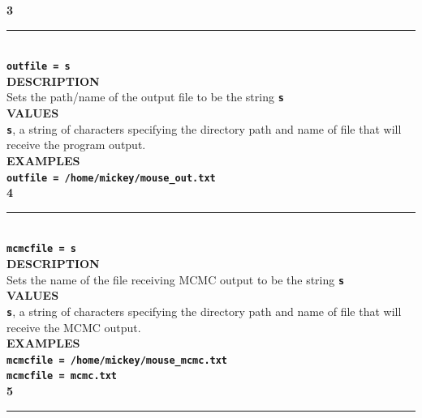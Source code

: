 \documentclass[a4paper]{book}
\numberwithin{equation}{section} \renewcommand{\baselinestretch}{0.55}
\begin{document}
\noindent\textbf{{\large 3}} \\
\noindent\rule{\textwidth}{0.8pt} \\
\textbf{{\Large \texttt{outfile = s}}} \vspace{5pt}\\
\textbf{DESCRIPTION} \vspace{5pt}\\
Sets the path/name of the output file to be the string \textbf{\texttt{s}} \vspace{5pt}\\
\textbf{VALUES} \vspace{5pt}\\
\textbf{\texttt{s}}, a string of characters specifying the directory path and name of file that will receive the program output. \vspace{5pt}\\
\textbf{EXAMPLES} \vspace{5pt}\\
\textbf{\texttt{outfile = /home/mickey/mouse\_out.txt}} \vspace{10pt}\\
\textbf{{\large 4}} \\
\noindent\rule{\textwidth}{0.8pt} \\
\textbf{{\Large \texttt{mcmcfile = s}}} \vspace{5pt} \\
\textbf{DESCRIPTION} \vspace{5pt}\\
Sets the name of the file receiving MCMC output to be the string \textbf{\texttt{s}} \vspace{5pt}\\
\textbf{VALUES} \vspace{5pt}\\
\textbf{\texttt{s}}, a string of characters specifying the directory path and name of file that will receive the MCMC output. \vspace{5pt}\\
\textbf{EXAMPLES} \vspace{5pt}\\
\textbf{\texttt{mcmcfile = /home/mickey/mouse\_mcmc.txt}} \vspace{5pt}\\
\textbf{\texttt{mcmcfile = mcmc.txt}} \vspace{10pt}\\
\textbf{{\large 5}} \\
\noindent\rule{\textwidth}{0.8pt} \\
\end{document}
